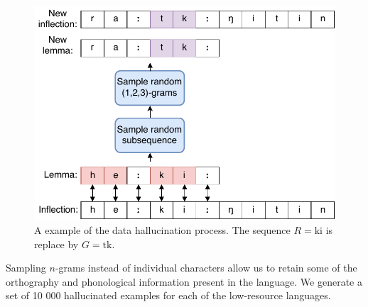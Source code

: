 \documentclass[11pt,a4paper]{article}
\begin{document}
\begin{figure}[h]
\centering
\includegraphics[scale=0.5]{hall.pdf}
\caption{\label{fig:hall} A example of the data hallucination process. The sequence $R=\text{ki}$ is replace by $G=\text{tk}$.}
\end{figure}


Sampling $n$-grams instead of individual characters allow us to retain
some of the orthography and phonological information present in the
language.  We generate a set of 10 000 hallucinated examples for each
of the low-resource languages.


\end{document}
